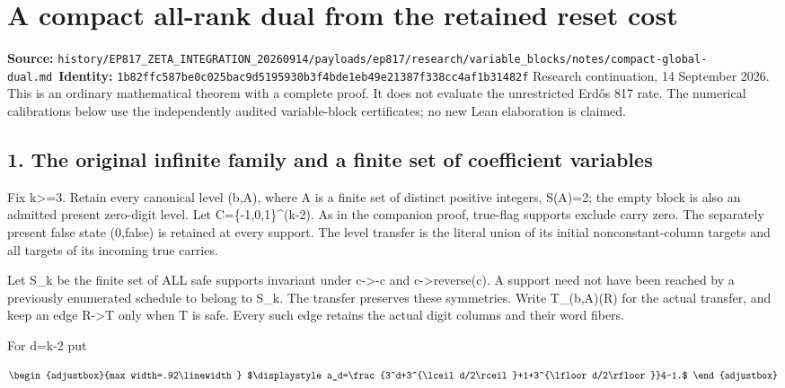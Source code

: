 \chapter{A compact all-rank dual from the retained reset cost}
\label{chapter:05_compact-global-dual}
{\small\noindent\textbf{Source:} \nolinkurl{history/EP817_ZETA_INTEGRATION_20260914/payloads/ep817/research/variable_blocks/notes/compact-global-dual.md}\
\textbf{Identity:} \nolinkurl{1b82ffc587be0c025bac9d5195930b3f4bde1eb49e21387f338cc4af1b31482f}}
\medskip
Research continuation, 14 September 2026. This is an ordinary mathematical theorem with a complete proof. It does not evaluate the unrestricted Erdős 817 rate. The numerical calibrations below use the independently audited variable-block certificates; no new Lean elaboration is claimed.

\section{1. The original infinite family and a finite set of coefficient variables}\label{n05-the-original-infinite-family-and-a-finite-set-of-coefficient-variables}

Fix k\textgreater=3. Retain every canonical level (b,A), where A is a finite set of distinct positive integers, S(A)=2; the empty block is also an admitted present zero-digit level. Let C=\{-1,0,1\}\^{}(k-2). As in the companion proof, true-flag supports exclude carry zero. The separately present false state (0,false) is retained at every support. The level transfer is the literal union of its initial nonconstant-column targets and all targets of its incoming true carries.

Let S\_k be the finite set of ALL safe supports invariant under c-\textgreater-c and c-\textgreater reverse(c). A support need not have been reached by a previously enumerated schedule to belong to S\_k. The transfer preserves these symmetries. Write T\_(b,A)(R) for the actual transfer, and keep an edge R-\textgreater T only when T is safe. Every such edge retains the actual digit columns and their word fibers.

For d=k-2 put

\[
\begin{adjustbox}{max width=.92\linewidth}
$\displaystyle a_d=\frac{3^d+3^{\lceil d/2\rceil}+1+3^{\lfloor d/2\rfloor}}4-1.$
\end{adjustbox}
\]


